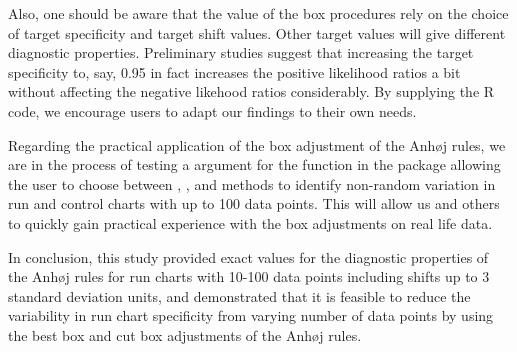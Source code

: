 Also, one should be aware that the value of the box procedures rely on
the choice of target specificity and target shift values. Other target
values will give different diagnostic properties. Preliminary studies
suggest that increasing the target specificity to, say, 0.95 in fact
increases the positive likelihood ratios a bit without affecting the
negative likehood ratios considerably. By supplying the R code, we
encourage users to adapt our findings to their own needs.

Regarding the practical application of the box adjustment of the Anhøj
rules, we are in the process of testing a  argument for the
 function in the  package allowing the
user to choose between , , and
 methods to identify non-random variation in run and
control charts with up to 100 data points. This will allow us and others
to quickly gain practical experience with the box adjustments on real
life data.

In conclusion, this study provided exact values for the diagnostic
properties of the Anhøj rules for run charts with 10-100 data points
including shifts up to 3 standard deviation units, and demonstrated that
it is feasible to reduce the variability in run chart specificity from
varying number of data points by using the best box and cut box
adjustments of the Anhøj rules.



\newpage


